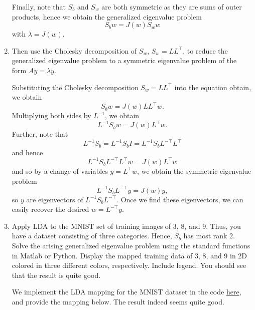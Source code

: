 \documentclass{../kin_math}
\begin{document}
\begin{questions}
\begin{enumerate}[label=\arabic*.]
\begin{solution}
      Finally, note that $S_b$ and $S_w$ are both symmetric as they are sums of outer products, hence we obtain the generalized eigenvalue problem
      \begin{equation*}
        S_b w = J(w) S_w w
      \end{equation*}
      with $\lambda = J(w)$.
    \end{solution}
    \item Then use the Cholesky decomposition of $S_w$, $S_w = LL^\top$, to reduce the generalized eigenvalue problem to a symmetric eigenvalue problem of the form $A y = \lambda y$.
    \begin{solution}
      Substituting the Cholesky decomposition $S_w = LL^\top$ into the equation obtain, we obtain
      \begin{equation*}
        S_b w = J(w) LL^\top w.
      \end{equation*}
      Multiplying both sides by $L^{-1}$, we obtain
      \begin{equation*}
        L^{-1} S_b w = J(w) L^\top w.
      \end{equation*}
      Further, note that
      \begin{equation*}
        L^{-1} S_b = L^{-1} S_b I = L^{-1} S_b L^{-\top} L^\top
      \end{equation*}
      and hence
      \begin{equation*}
        L^{-1} S_b L^{-\top} L^\top w = J(w) L^\top w
      \end{equation*}
      and so by a change of variables $y = L^\top w$, we obtain the symmetric eigenvalue problem
      \begin{equation*}
        L^{-1} S_b L^{-\top} y = J(w) y,
      \end{equation*}
      so $y$ are eigenvectors of $L^{-1} S_b L^{-\top}$. Once we find these eigenvectors, we can easily recover the desired $w = L^{-\top} y$.
    \end{solution}
    \item Apply LDA to the MNIST set of training images of 3, 8, and 9. Thus, you have a dataset consisting of three categories. Hence, $S_b$ has most rank 2. Solve the arising generalized eigenvalue problem using the standard functions in Matlab or Python. Display the mapped training data of 3, 8, and 9 in 2D colored in three different colors, respectively. Include legend.
    You should see that the result is quite good\smiley.
    \begin{solution}
      We implement the LDA mapping for the MNIST dataset in the code \href{https://github.com/elijahkin/amsc660/blob/main/final/final.ipynb}{here}, and provide the mapping below. The result indeed seems quite good.

\end{solution}
\end{enumerate}
\end{questions}
\end{document}
